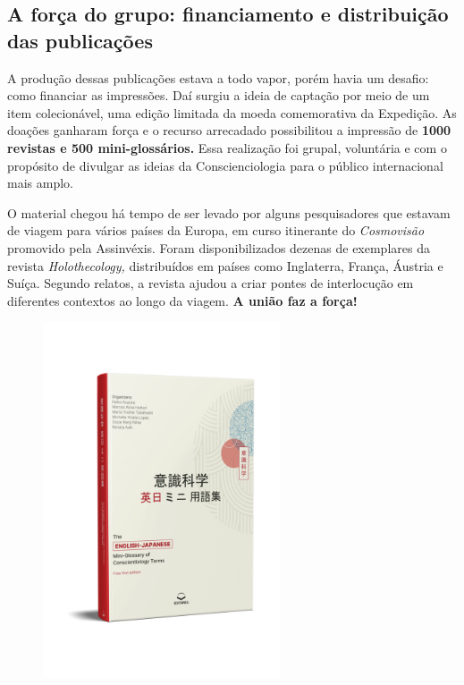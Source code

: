 \documentclass{gescons}
\begin{document}
\subsection*{A força do grupo: financiamento e distribuição das publicações}

A produção dessas publicações estava a todo vapor, porém havia um desafio: como financiar as impressões. Daí surgiu a ideia de captação por meio de um item colecionável, uma edição limitada da moeda comemorativa da Expedição. As doações ganharam força e o recurso arrecadado possibilitou a impressão de \textbf{1000 revistas e 500 mini-glossários.} Essa realização foi grupal, voluntária e com o propósito de divulgar as ideias da Conscienciologia para o público internacional mais amplo.

O material chegou há tempo de ser levado por alguns pesquisadores que estavam de viagem para vários países da Europa, em curso itinerante do \emph{Cosmovisão} promovido pela Assinvéxis. Foram disponibilizados dezenas de exemplares da revista \emph{Holothecology,} distribuídos em países como Inglaterra, França, Áustria e Suíça. Segundo relatos, a revista ajudou a criar pontes de interlocução em diferentes contextos ao longo da viagem. \textbf{A união faz a força!}


\begin{figure}
  \vspace{-15mm}\hspace{-8mm}\includegraphics[width=7cm]{articles/entrevista/mockups/Mini-Glossary.png}
\end{figure}
\end{document}
